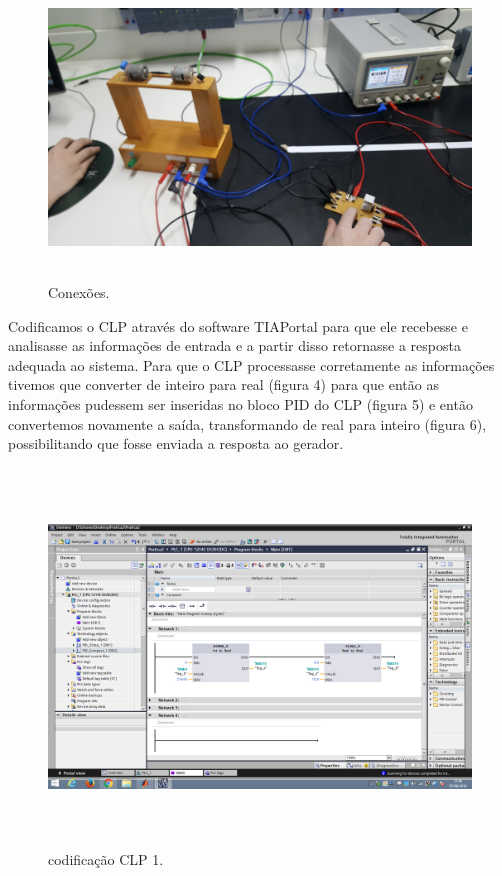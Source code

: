 \documentclass[12pt,a4paper]{article}
\begin{document}
\begin{figure}[H]
	\centering
	\caption{Conexões.}
	\label{fig:3}	
	\includegraphics[height=8cm]{figuras/conexoes_bancada1.jpg} %
\end{figure}

Codificamos o CLP através do software TIAPortal para que ele recebesse e analisasse as informações de entrada e a partir disso retornasse a resposta adequada ao sistema. Para que o CLP processasse corretamente as informações tivemos que converter de inteiro para real (figura 4) para que então as informações pudessem ser inseridas no bloco PID do CLP (figura 5) e então convertemos novamente a saída, transformando de real para inteiro (figura 6), possibilitando que fosse enviada a resposta ao gerador.

\begin{figure}[H]
	\centering
	\caption{codificação CLP 1.}
	\label{fig:4}	
	\includegraphics[height=10cm]{figuras/network1_clp.png} %
\end{figure}
\end{document}

